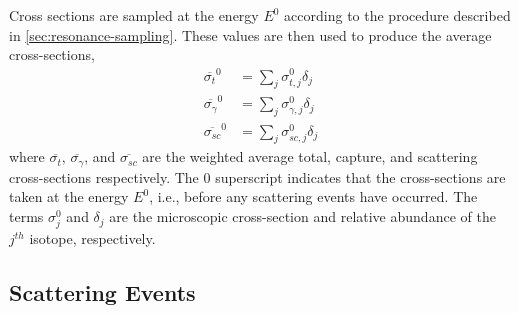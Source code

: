 Cross sections are sampled at the energy $E^0$ according to the procedure described in \autoref{sec:resonance-sampling}. These values are then used to produce the average cross-sections,
\begin{align}
    \label{eq:average-total-cross-section}
    \overline{ \sigma_{t} }^{0} &= \sum_{j} \sigma_{t,j}^{0} \delta_{j} \\
    \label{eq:average-capture-cross-section}
    \overline{ \sigma_{\gamma} }^{0} &= \sum_{j} \sigma_{\gamma,j}^{0} \delta_{j} \\
    \label{eq:average-scattering-cross-section}
    \overline{ \sigma_{sc} }^{0} &= \sum_{j} \sigma_{sc,j}^{0} \delta_{j}
\end{align}
where $\overline{ \sigma_{t} }$, $\overline{ \sigma_{\gamma} }$, and $\overline{ \sigma_{sc} }$  are the weighted average total, capture, and scattering cross-sections respectively. The $0$ superscript indicates that the cross-sections are taken at the energy $E^{0}$, i.e., before any scattering events have occurred. The terms $\sigma_{j}^0$ and $\delta_{j}$ are the microscopic cross-section and relative abundance of the $j^{th}$ isotope, respectively.

\subsection{Scattering Events}

